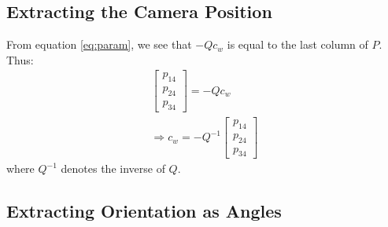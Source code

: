 \subsection{Extracting the Camera Position}

From equation \ref{eq:param}, we see that $-Qc_w$ is equal to the last column of $P$. Thus:
\begin{gather}
    \begin{bmatrix}
        p_{14} \\ p_{24} \\ p_{34}
    \end{bmatrix} = -Qc_w   \nonumber \\
    \Rightarrow \boxed{c_w = -Q^{-1}
    \begin{bmatrix}
        p_{14} \\ p_{24} \\ p_{34}
    \end{bmatrix}}
\end{gather}
where $Q^{-1}$ denotes the inverse of $Q$.

\subsection{Extracting Orientation as Angles}

